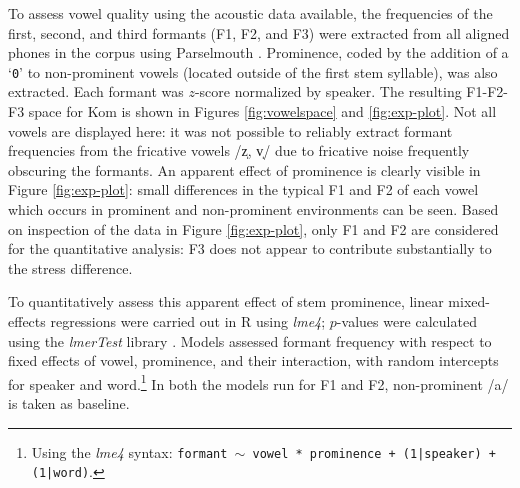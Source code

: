 \documentclass[output=paper,colorlinks,citecolor=brown
]{langscibook}
\begin{document}
To assess vowel quality using the acoustic data available, the frequencies of the first, second, and third formants (F1, F2, and F3) were extracted from all aligned phones in the corpus using Parselmouth \citep{jadoul}. Prominence, coded by the addition of a `\texttt{0}' to non-prominent vowels (located outside of the first stem syllable), was also extracted. 
Each formant was $z$-score normalized by speaker.
The resulting F1-F2-F3 space for Kom is shown in Figures \ref{fig:vowelspace} and \ref{fig:exp-plot}. 
Not all vowels are displayed here: it was not possible to reliably extract formant frequencies from the fricative vowels /z̩, v̩/ due to fricative noise frequently obscuring the formants.
An apparent effect of prominence is clearly visible in Figure \ref{fig:exp-plot}: small differences in the typical F1 and F2 of each vowel which occurs in prominent and non-prominent environments can be seen. 
Based on inspection of the data in Figure \ref{fig:exp-plot}, only F1 and F2 are considered for the quantitative analysis: F3 does not appear to contribute substantially to the stress difference.

\largerpage
To quantitatively assess this apparent effect of stem prominence, linear mixed-effects regressions were carried out in R using \textit{lme4}; $p$-values were calculated using the \textit{lmerTest} library \citep{lme4, lmerTest}. Models assessed formant frequency with respect to fixed effects of vowel, prominence, and their interaction, with random intercepts for speaker and word.\footnote{Using the \textit{lme4} syntax: \texttt{formant $\sim$ vowel * prominence + (1|speaker) + (1|word)}.}
In both the models run for F1 and F2, non-prominent /a/ is taken as baseline. 
\end{document}

